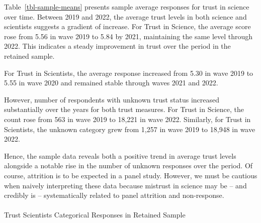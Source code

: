 \documentclass[
  single column]{article}
\makeatletter
\let\oldparagraph\paragraph
\renewcommand{\paragraph}{
    \@ifstar
      \xxxParagraphStar
      \xxxParagraphNoStar
  }
\newcommand{\xxxParagraphStar}[1]{\oldparagraph*{#1}\mbox{}}
\newcommand{\xxxParagraphNoStar}[1]{\oldparagraph{#1}\mbox{}}
\makeatother
\begin{document}
Table~\ref{tbl-sample-means} presents sample average responses for trust
in science over time. Between 2019 and 2022, the average trust levels in
both science and scientists suggests a gradient of increase. For Trust
in Science, the average score rose from 5.56 in wave 2019 to 5.84 by
2021, maintaining the same level through 2022. This indicates a steady
improvement in trust over the period in the retained sample.

For Trust in Scientists, the average response increased from 5.30 in
wave 2019 to 5.55 in wave 2020 and remained stable through waves 2021
and 2022.

However, number of respondents with unknown trust status increased
substantially over the years for both trust measures. For Trust in
Science, the count rose from 563 in wave 2019 to 18,221 in wave 2022.
Similarly, for Trust in Scientists, the unknown category grew from 1,257
in wave 2019 to 18,948 in wave 2022.

Hence, the sample data reveals both a positive trend in average trust
levels alongside a notable rise in the number of unknown responses over
the period. Of course, attrition is to be expected in a panel study.
However, we must be cautious when naively interpreting these data
because mistrust in science may be -- and credibly is -- systematically
related to panel attrition and non-response.

\paragraph{Trust Scientists Categorical Responses in Retained
Sample}\label{trust-scientists-categorical-responses-in-retained-sample}
\end{document}
